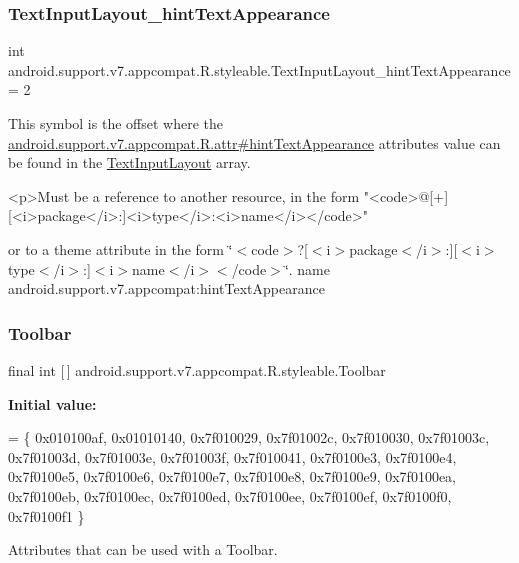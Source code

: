 \subsubsection{\texorpdfstring{Text\+Input\+Layout\+\_\+hint\+Text\+Appearance}{TextInputLayout\_hintTextAppearance}}
{\footnotesize\ttfamily int android.\+support.\+v7.\+appcompat.\+R.\+styleable.\+Text\+Input\+Layout\+\_\+hint\+Text\+Appearance = 2\hspace{0.3cm}{\ttfamily [static]}}

This symbol is the offset where the \hyperlink{classandroid_1_1support_1_1v7_1_1appcompat_1_1R_1_1attr_ae5b2a2b9f322fa06f784d73f1e4ac50c}{android.\+support.\+v7.\+appcompat.\+R.\+attr\#hint\+Text\+Appearance} attribute\textquotesingle{}s value can be found in the \hyperlink{classandroid_1_1support_1_1v7_1_1appcompat_1_1R_1_1styleable_a618db13ebe8aab96f9d951a0d1c7d5bc}{Text\+Input\+Layout} array.

\begin{DoxyVerb}      <p>Must be a reference to another resource, in the form "<code>@[+][<i>package</i>:]<i>type</i>:<i>name</i></code>"
\end{DoxyVerb}
 or to a theme attribute in the form \char`\"{}$<$code$>$?\mbox{[}$<$i$>$package$<$/i$>$\+:\mbox{]}\mbox{[}$<$i$>$type$<$/i$>$\+:\mbox{]}$<$i$>$name$<$/i$>$$<$/code$>$\char`\"{}.  name android.\+support.\+v7.\+appcompat\+:hint\+Text\+Appearance \mbox{\label{classandroid_1_1support_1_1v7_1_1appcompat_1_1R_1_1styleable_a2daba9587ef9f700f2d54cf13435cb32}} 
\subsubsection{\texorpdfstring{Toolbar}{Toolbar}}
{\footnotesize\ttfamily final int \mbox{[}$\,$\mbox{]} android.\+support.\+v7.\+appcompat.\+R.\+styleable.\+Toolbar\hspace{0.3cm}{\ttfamily [static]}}

{\bfseries Initial value\+:}
\begin{DoxyCode}
= \{
            0x010100af, 0x01010140, 0x7f010029, 0x7f01002c,
            0x7f010030, 0x7f01003c, 0x7f01003d, 0x7f01003e,
            0x7f01003f, 0x7f010041, 0x7f0100e3, 0x7f0100e4,
            0x7f0100e5, 0x7f0100e6, 0x7f0100e7, 0x7f0100e8,
            0x7f0100e9, 0x7f0100ea, 0x7f0100eb, 0x7f0100ec,
            0x7f0100ed, 0x7f0100ee, 0x7f0100ef, 0x7f0100f0,
            0x7f0100f1
        \}
\end{DoxyCode}
Attributes that can be used with a Toolbar. 

